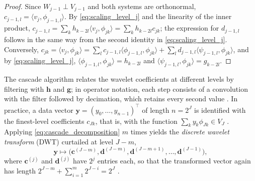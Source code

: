 \begin{proof}
Since $W_{j-1}\perp V_{j-1}$ and both systems are orthonormal,
$c_{j-1,l} = \langle v_j,\phi_{j-1,l}\rangle$. By \eqref{eq:scaling_level_j}
and the linearity of the inner product,
$c_{j-1,l} = \sum_kh_{k-2l}\langle v_j,\phi_{jk}\rangle =
\sum_kh_{k-2l}c_{jk}$; the expression for $d_{j-1,l}$ follows in the same
way from the second identity in \eqref{eq:scaling_level_j}. Conversely,
$c_{jk} = \langle v_j,\phi_{jk}\rangle = \sum_lc_{j-1,l}\langle\phi_{j-1,l},
\phi_{jk}\rangle + \sum_ld_{j-1,l}\langle\psi_{j-1,l},\phi_{jk}\rangle$, and
by \eqref{eq:scaling_level_j}, $\langle\phi_{j-1,l},\phi_{jk}\rangle =
h_{k-2l}$ and $\langle\psi_{j-1,l},\phi_{jk}\rangle = g_{k-2l}$.
\end{proof}

The cascade algorithm relates the wavelet coefficients at different levels
by filtering with $\mathbf{h}$ and $\mathbf{g}$; in operator notation, each
step consists of a convolution with the filter followed by decimation, which
retains every second value \cite[Sec.~4.3]{vidakovic1999}. In practice, a data vector
$\mathbf{y} = (y_0,\dots,y_{n-1})^\top$ of length $n = 2^J$ is identified
with the finest-level coefficients $c_{Jk}$, that is, with the function
$\sum_ky_k\phi_{Jk}\in V_J$ \cite[Sec.~4.3]{vidakovic1999}. Applying
\eqref{eq:cascade_decomposition} $m$ times yields the \emph{discrete wavelet
transform} (DWT) curtailed at level $J-m$,
\begin{equation}
\mathbf{y}\mapsto\bigl(\mathbf{c}^{(J-m)},\mathbf{d}^{(J-m)},
\mathbf{d}^{(J-m+1)},\dots,\mathbf{d}^{(J-1)}\bigr),
\label{eq:dwt_vector}
\end{equation}
where $\mathbf{c}^{(j)}$ and $\mathbf{d}^{(j)}$ have $2^j$ entries each, so
that the transformed vector again has length
$2^{J-m}+\sum_{i=1}^m2^{J-i} = 2^J$ \cite[Sec.~4.3]{vidakovic1999}.

